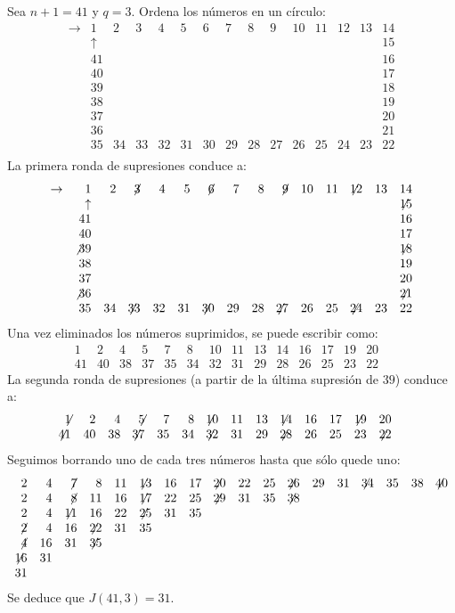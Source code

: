 \begin{example}
Sea $n+1=41$ y $q=3$. Ordena los números en un círculo:
\[
\begin{array}{rrrrrrrrrrrrrrrrrrrrrrr}
\rightarrow&1&2&3&4&5&6&7&8&9&10&11&12&13&14\\
&\uparrow&&&&&&&&&&&&&15\\
&41&&&&&&&&&&&&&16\\
&40&&&&&&&&&&&&&17\\
&39&&&&&&&&&&&&&18\\
&38&&&&&&&&&&&&&19\\
&37&&&&&&&&&&&&&20\\
&36&&&&&&&&&&&&&21\\
&35&34&33&32&31&30&29&28&27&26&25&24&23&22\\
\end{array}
\]
La primera ronda de supresiones conduce a:
\[
\begin{array}{rrrrrrrrrrrrrrrrrrrrrrr}
\rightarrow&1&2&\not\! 3&4&5&\not\! 6&7&8&\not\! 9&10&11&\not\!\! 12&13&14\\
&\uparrow&&&&&&&&&&&&&\not\!\! 15\\
&41&&&&&&&&&&&&&16\\
&40&&&&&&&&&&&&&17\\
&\not 39&&&&&&&&&&&&&\not\!\! 18\\
&38&&&&&&&&&&&&&19\\
&37&&&&&&&&&&&&&20\\
&\not 36&&&&&&&&&&&&&\not\!\! 21\\
&35&34&\not\!\! 33&32&31&\not\!\! 30&29&28&\not\!\! 27&26&25&\not\!\! 24&23&22\\
\end{array}
\]
Una vez eliminados los números suprimidos, se puede escribir como:
\[
\begin{array}{rrrrrrrrrrrrrrrrrrrrrrrrrrrr}
1&2&4&5&7&8&10&11&13&14&16&17&19&20&\\
41&40&38&37&35&34&32&31&29&28&26&25&23&22&
\end{array}
\]
La segunda ronda de supresiones (a partir de la última supresión de $39$) conduce a:
\[
\begin{array}{rrrrrrrrrrrrrrrrrrrrrrrrrrrr}
\not\!\! 1&2&4&\not\!\! 5&7&8&\not\!\! 10&11&13&\not\!\! 14&16&17&\not\!\! 19&20&\\
\not\!\!41&40&38&\not\!\!37&35&34&\not\!\!32&31&29&\not\!\!28&26&25&23&\not\!\!22&
\end{array}
\]
Seguimos borrando uno de cada tres números hasta que sólo quede uno:
\[
\begin{array}{rrrrrrrrrrrrrrrrrr}
2&4&\not\!7&8&11&\not\!\!13&16&17&\not\!\!20&22&25&\not\!\!26&29&31&\not\!\!34&35&38&\not\!\!40
\\
2&4&\not\!8&11&16&\not\!\!17&22&25&\not\!\!29&31&35&\not\!\!38
\\
2&4&\not\!\!11&16&22&\not\!\!25&31&35
\\
\not\!2&4&16&\not\!\!22&31&35
\\
\not\!4&16&31&\not\!\!35
\\
\not\!\!16&31
\\
31
\end{array}
\]
Se deduce que $J(41,3)=31$.
\end{example}

